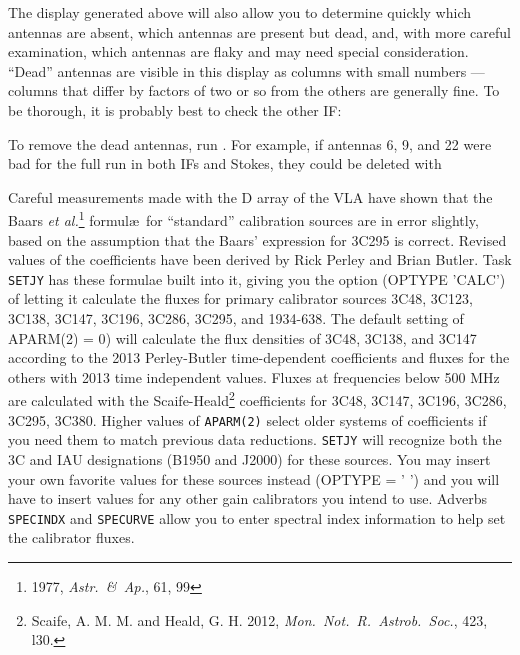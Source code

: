      The display generated above will also allow you to determine
quickly which antennas are absent, which antennas are present but
dead, and, with more careful examination, which antennas are flaky and
may need special consideration.  ``Dead'' antennas are visible in this
display as columns with small numbers --- columns that differ by
factors of two or so from the others are generally fine.  To be
thorough, it is probably best to check the other IF:

     To remove the dead antennas, run \hbox{{\tt {}}}.  For
example, if antennas 6, 9, and 22 were bad for the full run in both
IFs and Stokes, they could be deleted with


      Careful measurements made with the D array of the VLA have shown
that the Baars {\it et al.\/}\footnote{1977, {\it Astr.~\&\ Ap.}, 61,
99} formul\ae\ for ``standard'' calibration sources are in error
slightly, based on the assumption that the Baars' expression for 3C295
is correct.   Revised values of the coefficients have been derived by
Rick Perley and Brian Butler.  Task {\tt SETJY} has these formulae
built into it, giving you the option ({\us OPTYPE 'CALC'}) of letting
it calculate the fluxes for primary calibrator sources 3C48, 3C123,
3C138, 3C147, 3C196, 3C286, 3C295, and 1934-638.  The default setting
of {\us APARM(2) = 0}) will calculate the flux densities of 3C48,
3C138, and 3C147 according to the 2013 Perley-Butler time-dependent
coefficients and fluxes for the others with 2013 time independent
values.  Fluxes at frequencies below 500 MHz are calculated with the
Scaife-Heald\footnote{Scaife, A. M. M. and Heald, G. H. 2012, {\it
Mon.~Not.~R.~Astrob.~Soc.}, 423, l30.} coefficients for 3C48, 3C147,
3C196, 3C286, 3C295, 3C380.  Higher values of {\tt APARM(2)} select
older systems of coefficients if you need them to match previous data
reductions.  {\tt SETJY} will recognize both the 3C and IAU
designations (B1950 and J2000) for these sources.  You may insert your
own favorite values for these sources instead ({\us OPTYPE = ' '}) and
you will have to insert values for any other gain calibrators you
intend to use.  Adverbs {\tt SPECINDX} and {\tt SPECURVE} allow you to
enter spectral index information to help set the calibrator
fluxes.

